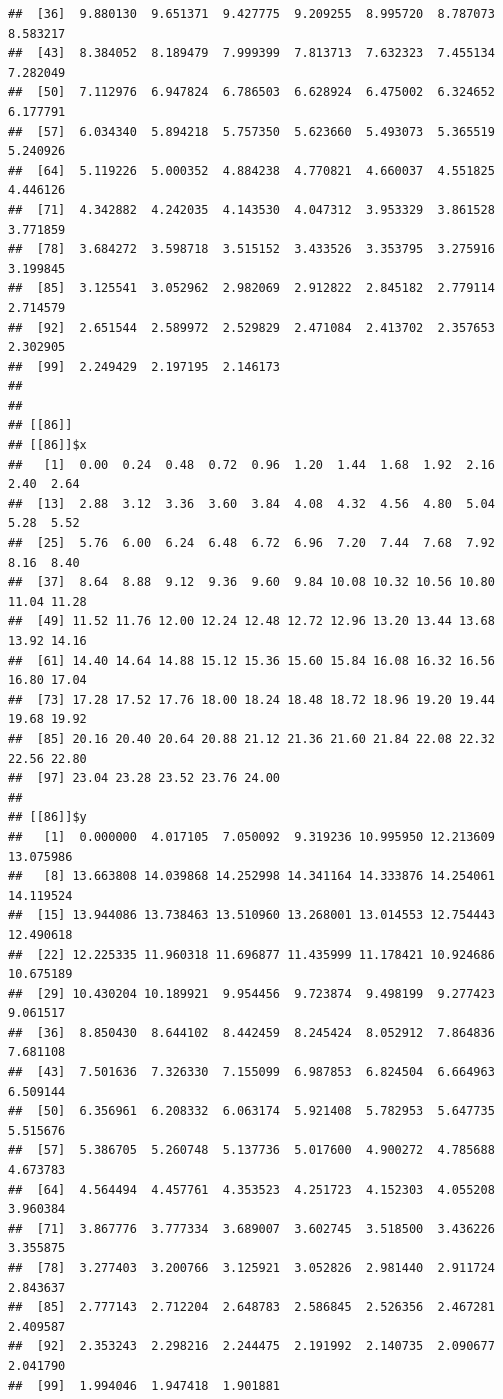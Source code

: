 \documentclass[
  ignorenonframetext,
]{beamer}
\begin{document}
\begin{frame}[fragile]{}
\begin{verbatim}
##  [36]  9.880130  9.651371  9.427775  9.209255  8.995720  8.787073  8.583217
##  [43]  8.384052  8.189479  7.999399  7.813713  7.632323  7.455134  7.282049
##  [50]  7.112976  6.947824  6.786503  6.628924  6.475002  6.324652  6.177791
##  [57]  6.034340  5.894218  5.757350  5.623660  5.493073  5.365519  5.240926
##  [64]  5.119226  5.000352  4.884238  4.770821  4.660037  4.551825  4.446126
##  [71]  4.342882  4.242035  4.143530  4.047312  3.953329  3.861528  3.771859
##  [78]  3.684272  3.598718  3.515152  3.433526  3.353795  3.275916  3.199845
##  [85]  3.125541  3.052962  2.982069  2.912822  2.845182  2.779114  2.714579
##  [92]  2.651544  2.589972  2.529829  2.471084  2.413702  2.357653  2.302905
##  [99]  2.249429  2.197195  2.146173
## 
## 
## [[86]]
## [[86]]$x
##   [1]  0.00  0.24  0.48  0.72  0.96  1.20  1.44  1.68  1.92  2.16  2.40  2.64
##  [13]  2.88  3.12  3.36  3.60  3.84  4.08  4.32  4.56  4.80  5.04  5.28  5.52
##  [25]  5.76  6.00  6.24  6.48  6.72  6.96  7.20  7.44  7.68  7.92  8.16  8.40
##  [37]  8.64  8.88  9.12  9.36  9.60  9.84 10.08 10.32 10.56 10.80 11.04 11.28
##  [49] 11.52 11.76 12.00 12.24 12.48 12.72 12.96 13.20 13.44 13.68 13.92 14.16
##  [61] 14.40 14.64 14.88 15.12 15.36 15.60 15.84 16.08 16.32 16.56 16.80 17.04
##  [73] 17.28 17.52 17.76 18.00 18.24 18.48 18.72 18.96 19.20 19.44 19.68 19.92
##  [85] 20.16 20.40 20.64 20.88 21.12 21.36 21.60 21.84 22.08 22.32 22.56 22.80
##  [97] 23.04 23.28 23.52 23.76 24.00
## 
## [[86]]$y
##   [1]  0.000000  4.017105  7.050092  9.319236 10.995950 12.213609 13.075986
##   [8] 13.663808 14.039868 14.252998 14.341164 14.333876 14.254061 14.119524
##  [15] 13.944086 13.738463 13.510960 13.268001 13.014553 12.754443 12.490618
##  [22] 12.225335 11.960318 11.696877 11.435999 11.178421 10.924686 10.675189
##  [29] 10.430204 10.189921  9.954456  9.723874  9.498199  9.277423  9.061517
##  [36]  8.850430  8.644102  8.442459  8.245424  8.052912  7.864836  7.681108
##  [43]  7.501636  7.326330  7.155099  6.987853  6.824504  6.664963  6.509144
##  [50]  6.356961  6.208332  6.063174  5.921408  5.782953  5.647735  5.515676
##  [57]  5.386705  5.260748  5.137736  5.017600  4.900272  4.785688  4.673783
##  [64]  4.564494  4.457761  4.353523  4.251723  4.152303  4.055208  3.960384
##  [71]  3.867776  3.777334  3.689007  3.602745  3.518500  3.436226  3.355875
##  [78]  3.277403  3.200766  3.125921  3.052826  2.981440  2.911724  2.843637
##  [85]  2.777143  2.712204  2.648783  2.586845  2.526356  2.467281  2.409587
##  [92]  2.353243  2.298216  2.244475  2.191992  2.140735  2.090677  2.041790
##  [99]  1.994046  1.947418  1.901881

\end{verbatim}
\end{frame}
\end{document}
